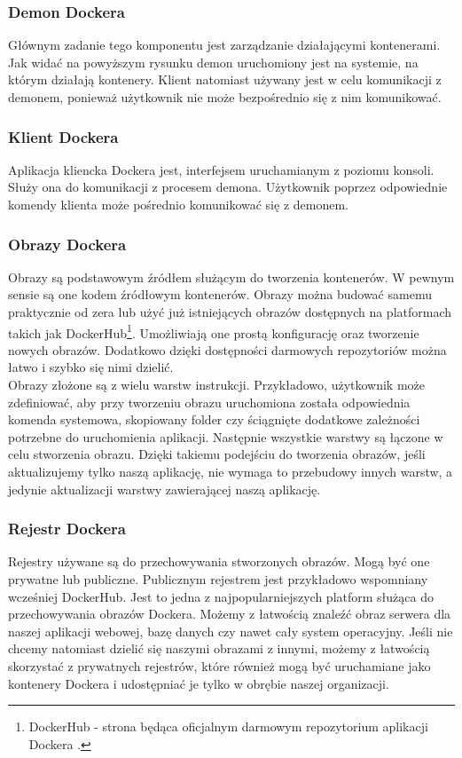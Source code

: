 \documentclass[12pt]{report}
\let\Oldsubsubsection\subsubsection
\renewcommand{\subsubsection}{\FloatBarrier\Oldsubsubsection}
\begin{document}
\subsubsection{Demon Dockera}
Głównym zadanie tego komponentu jest zarządzanie działającymi kontenerami. Jak widać na powyższym rysunku demon uruchomiony jest na systemie, na którym działają kontenery. Klient natomiast używany jest w celu komunikacji z demonem, ponieważ użytkownik nie może bezpośrednio się z nim komunikować.

\subsubsection{Klient Dockera}
Aplikacja kliencka Dockera jest, interfejsem uruchamianym z poziomu konsoli. Służy ona do komunikacji z procesem demona. Użytkownik poprzez odpowiednie komendy klienta może pośrednio komunikować się z demonem.

\subsubsection{Obrazy Dockera}
Obrazy są podstawowym źródłem służącym do tworzenia kontenerów. W pewnym sensie są one kodem źródłowym kontenerów. Obrazy można budować samemu praktycznie od zera lub użyć już istniejących obrazów dostępnych na platformach takich jak DockerHub\footnote{DockerHub - strona będąca oficjalnym darmowym repozytorium aplikacji Dockera \cite{dockerhub}.}. Umożliwiają one prostą konfigurację oraz tworzenie nowych obrazów. Dodatkowo dzięki dostępności darmowych repozytoriów można łatwo i szybko się nimi dzielić. \\
\indent Obrazy złożone są z wielu warstw instrukcji. Przykładowo, użytkownik może zdefiniować, aby przy tworzeniu obrazu uruchomiona została odpowiednia komenda systemowa, skopiowany folder czy ściągnięte dodatkowe zależności potrzebne do uruchomienia aplikacji. Następnie wszystkie warstwy są łączone w celu stworzenia obrazu. Dzięki takiemu podejściu do tworzenia obrazów, jeśli aktualizujemy tylko naszą aplikację, nie wymaga to przebudowy innych warstw, a jedynie aktualizacji warstwy zawierającej naszą aplikację.

\subsubsection{Rejestr Dockera}
Rejestry używane są do przechowywania stworzonych obrazów. Mogą być one prywatne lub publiczne. Publicznym rejestrem jest przykładowo wspomniany wcześniej DockerHub. Jest to jedna z najpopularniejszych platform służąca do przechowywania obrazów Dockera. Możemy z łatwością znaleźć obraz serwera dla naszej aplikacji webowej, bazę danych czy nawet cały system operacyjny. Jeśli nie chcemy natomiast dzielić się naszymi obrazami z innymi, możemy z łatwością skorzystać z prywatnych rejestrów, które również mogą być uruchamiane jako kontenery Dockera i udostępniać je tylko w obrębie naszej organizacji.
\end{document}
